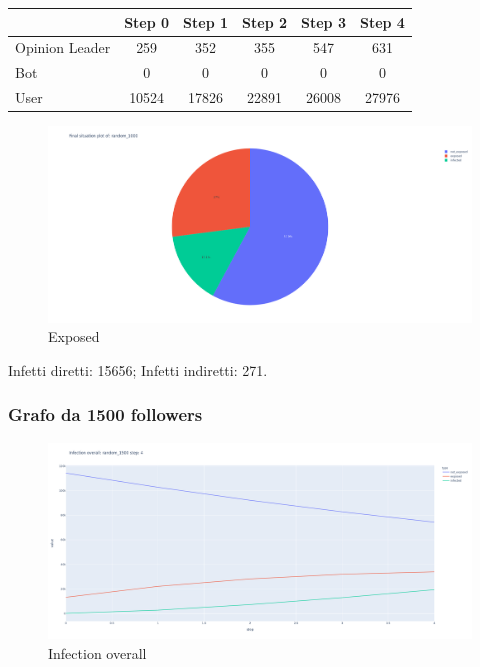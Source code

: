         \begin{table}[H]
            \centering
            \begin{tabular}{|l|c|c|c|c|c|}
            \hline
                           & Step 0 & Step 1 & Step 2 & Step 3 & Step 4 \\ \hline
            Opinion Leader & 259    & 352    & 355    & 547    & 631    \\ \hline
            Bot            & 0      & 0      & 0      & 0      & 0      \\ \hline
            User           & 10524  & 17826  & 22891  & 26008  & 27976  \\ \hline
            \end{tabular}
        \end{table}
        
        \begin{figure}[H]
                \includegraphics[width=16cm]{resources/charts/random_1000_pie.png}
                \caption{Exposed}
                \label{fig:random_1000_pie}
        \end{figure}
        Infetti diretti: 15656; \newline
        Infetti indiretti: 271.
            
    \subsubsection{Grafo da 1500 followers}
        \begin{figure}[H]
            \includegraphics[width=16cm]{resources/charts/random_1500_line.png}
            \caption{Infection overall}
            \label{fig:random_1500_line}
        \end{figure}
        
